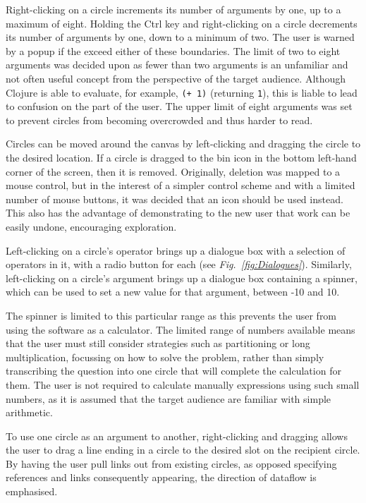 \documentclass[12pt,twoside,notitlepage,xetex]{report}
\begin{document}
Right-clicking on a circle increments its number of arguments by one, up to a maximum of eight.  Holding the Ctrl key and right-clicking on a circle decrements its number of arguments by one, down to a minimum of two.  The user is warned by a popup if the exceed either of these boundaries.  The limit of two to eight arguments was decided upon as fewer than two arguments is an unfamiliar and not often useful concept from the perspective of the target audience.  Although Clojure is able to evaluate, for example, \verb¬(+ 1)¬ (returning \verb¬1¬), this is liable to lead to confusion on the part of the user.  The upper limit of eight arguments was set to prevent circles from becoming overcrowded and thus harder to read.

Circles can be moved around the canvas by left-clicking and dragging the circle to the desired location.  If a circle is dragged to the bin icon in the bottom left-hand corner of the screen, then it is removed.  Originally, deletion was mapped to a mouse control, but in the interest of a simpler control scheme and with a limited number of mouse buttons, it was decided that an icon should be used instead.  This also has the advantage of demonstrating to the new user that work can be easily undone, encouraging exploration.

Left-clicking on a circle's operator brings up a dialogue box with a selection of operators in it, with a radio button for each (see \emph{Fig.~\ref{fig:Dialogues}}).  Similarly, left-clicking on a circle's argument brings up a dialogue box containing a spinner, which can be used to set a new value for that argument, between -10 and 10.

The spinner is limited to this particular range as this prevents the user from using the software as a calculator.  The limited range of numbers available means that the user must still consider strategies such as partitioning or long multiplication, focussing on how to solve the problem, rather than simply transcribing the question into one circle that will complete the calculation for them.  The user is not required to calculate manually expressions using such small numbers, as it is assumed that the target audience are familiar with simple arithmetic.

To use one circle as an argument to another, right-clicking and dragging allows the user to drag a line ending in a circle to the desired slot on the recipient circle.  By having the user pull links out from existing circles, as opposed specifying references and links consequently appearing, the direction of dataflow is emphasised.
\end{document}
